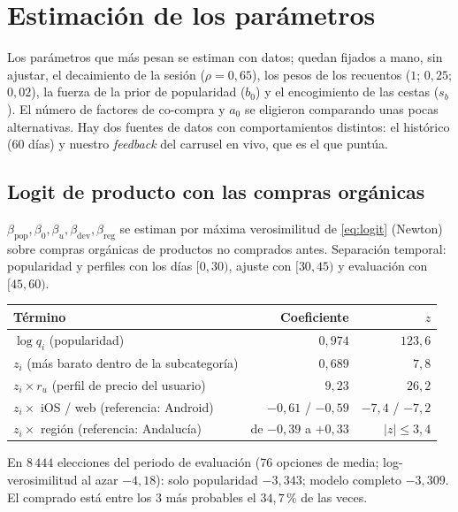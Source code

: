 \documentclass[11pt,a4paper]{article}
\begin{document}
\section{Estimación de los parámetros}

Los parámetros que más pesan se estiman con datos; quedan fijados a mano, sin ajustar, el decaimiento de la
sesión ($\rho=0{,}65$), los pesos de los recuentos ($1$; $0{,}25$; $0{,}02$), la fuerza de la prior de
popularidad ($b_0$) y el encogimiento de las cestas ($s_b$). El número de factores de co-compra y $a_0$ se
eligieron comparando unas pocas alternativas. Hay dos fuentes de datos con comportamientos distintos:
el histórico (60 días) y nuestro \emph{feedback} del carrusel en vivo, que es el que puntúa.

\subsection{Logit de producto con las compras orgánicas}

$\beta_{\text{pop}},\beta_0,\beta_u,\beta_{\text{dev}},\beta_{\text{reg}}$ se estiman por máxima
verosimilitud de \eqref{eq:logit} (Newton) sobre compras orgánicas de productos no comprados antes.
Separación temporal: popularidad y perfiles con los días $[0,30)$, ajuste con $[30,45)$ y evaluación
con $[45,60)$.

\begin{center}
\begin{tabular}{lrr}
\toprule
Término & Coeficiente & $z$\\
\midrule
$\log q_i$ (popularidad) & $0{,}974$ & $123{,}6$\\
$z_i$ (más barato dentro de la subcategoría) & $0{,}689$ & $7{,}8$\\
$z_i\times r_u$ (perfil de precio del usuario) & $9{,}23$ & $26{,}2$\\
$z_i\times$ iOS \;/\; web (referencia: Android) & $-0{,}61$ \;/\; $-0{,}59$ & $-7{,}4$ \;/\; $-7{,}2$\\
$z_i\times$ región (referencia: Andalucía) & de $-0{,}39$ a $+0{,}33$ & $|z|\le 3{,}4$\\
\bottomrule
\end{tabular}
\end{center}

En $8\,444$ elecciones del periodo de evaluación (76 opciones de media; log-verosimilitud al azar
$-4{,}18$): solo popularidad $-3{,}343$; modelo completo $-3{,}309$. El comprado está entre los 3 más
probables el $34{,}7$\,\% de las veces.
\end{document}
